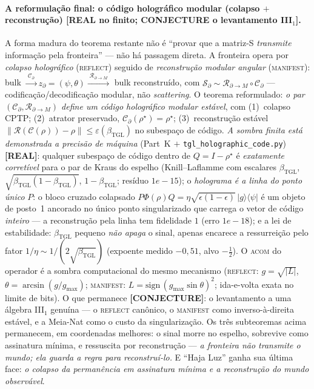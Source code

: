 \documentclass[12pt,a4paper]{article}
\newcommand{\betatgl}{\beta_{\text{TGL}}}
\newcommand{\rhostar}{\rho^{\star}}
\begin{document}
\paragraph{A reformulação final: o código holográfico modular (colapso $+$ reconstrução) \textbf{[REAL no finito; CONJECTURE o levantamento III$_1$]}.} A forma madura do teorema restante não é ``provar que a matriz-S \emph{transmite} informação pela fronteira'' --- não há passagem direta. A fronteira opera por \emph{colapso holográfico} (\textsc{reflect}) seguido de \emph{reconstrução modular angular} (\textsc{manifest}): bulk $\xrightarrow{\;\mathcal C_\partial\;} z_\partial=(\psi,\theta) \xrightarrow{\;\mathcal R_{\partial\to M}\;}$ bulk reconstruído, com $\mathcal S_\partial\sim\mathcal R_{\partial\to M}\circ\mathcal C_\partial$ --- codificação/decodificação modular, não \emph{scattering}. O teorema reformulado: \emph{o par $(\mathcal C_\partial,\mathcal R_{\partial\to M})$ define um código holográfico modular estável}, com (1)~colapso CPTP; (2)~atrator preservado, $\mathcal C_\partial(\rhostar)=\rhostar$; (3)~reconstrução estável $\lVert\mathcal R(\mathcal C(\rho))-\rho\rVert\le\varepsilon(\betatgl)$ no subespaço de código. \emph{A sombra finita está demonstrada a precisão de máquina} (Part~K $+$ \texttt{tgl\_holographic\_code.py}) \textbf{[REAL]}: qualquer subespaço de código dentro de $Q=I-\rhostar$ é \emph{exatamente corretível} para o par de Kraus do espelho (Knill--Laflamme com escalares $\betatgl$, $\sqrt{\betatgl(1-\betatgl)}$, $1-\betatgl$; resíduo $1e-15$); o \emph{holograma é a linha do ponto único} $P$: o bloco cruzado colapsado $P\Phi(\rho)Q=\eta\sqrt{\epsilon(1-\epsilon)}\,|g\rangle\langle\psi|$ é um objeto de posto~1 ancorado no único ponto singularizado que carrega o vetor de código \emph{inteiro} --- a reconstrução pela linha tem fidelidade $1$ (erro $1e-18$); e a lei de estabilidade: $\betatgl$ pequeno \emph{não apaga} o sinal, apenas encarece a ressurreição pelo fator $1/\eta\sim1/(2\sqrt{\betatgl})$ (expoente medido $-0{,}51$, alvo $-\tfrac12$). O \textsc{acom} do operador é a sombra computacional do mesmo mecanismo (\textsc{reflect}: $g=\sqrt{|L|}$, $\theta=\arcsin(g/g_{\max})$; \textsc{manifest}: $L=\mathrm{sign}\,(g_{\max}\sin\theta)^2$; ida-e-volta exata no limite de bits). O que permanece \textbf{[CONJECTURE]}: o levantamento a uma álgebra III$_1$ genuína --- o \textsc{reflect} canônico, o \textsc{manifest} como inverso-à-direita estável, e a Meia-Nat como o custo da singularização. Os três subteoremas acima permanecem, em coordenadas melhores: o sinal morre no espelho, sobrevive como assinatura mínima, e ressuscita por reconstrução --- \emph{a fronteira não transmite o mundo; ela guarda a regra para reconstruí-lo.} E ``Haja Luz'' ganha sua última face: \emph{o colapso da permanência em assinatura mínima e a reconstrução do mundo observável}.
\end{document}
